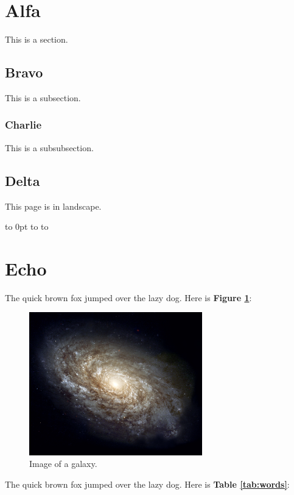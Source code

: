 \documentclass[12pt]{article}
\def\lscapefooter{
    \par\pagestyle{empty}
    \vbox to 0pt{
        \baselineskip0pt
        \hbox to\linewidth{\hss}
        \baselineskip\footskip
        \hbox to\linewidth{\hfill Page \thepage\ of \pageref{LastPage} \hfill}
        \vss
    }
}
\begin{document}
\section{Alfa}
This is a section.

\subsection{Bravo}
This is a subsection.

\subsubsection{Charlie}
This is a subsubsection.

\clearpage

\begin{landscape}

\section{Delta}
This page is in landscape.

\vfill
\lscapefooter

\end{landscape}

\section{Echo}
The quick brown fox jumped over the lazy dog. Here is \textbf{Figure \ref{fig:galaxy}}:

\begin{figure}[H]
    \centering
    \includegraphics[width=0.67\textwidth]{figures/galaxy.jpg}
    \caption{Image of a galaxy.}
    \label{fig:galaxy}
\end{figure}

The quick brown fox jumped over the lazy dog. Here is \textbf{Table \ref{tab:words}}:
\end{document}
